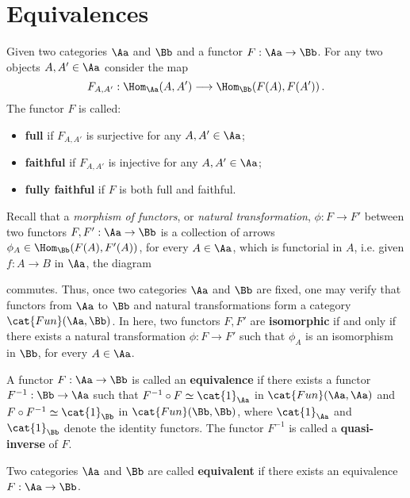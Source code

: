 
\section{Equivalences}

\begin{df}
    Given two categories $\Aa$ and $\Bb$ and
    a functor $F : \Aa \to \Bb$.
    For any two objects $A, A' \in \Aa$ 
    consider the map
    \begin{equation*}
        F_{A,A'} : \Hom_{\Aa}(A,A') \longrightarrow \Hom_{\Bb}(F(A),F(A'))\,.
    \end{equation*}
    The functor $F$ is called:
    \begin{itemize}
        \item \textbf{full} if $F_{A,A'}$ is surjective
        for any $A, A' \in \Aa$;

        \item \textbf{faithful} if $F_{A,A'}$ is injective
        for any $A, A' \in \Aa$;

        \item \textbf{fully faithful} if $F$ is both full and faithful.
    \end{itemize}
\end{df}

Recall that a \emph{morphism of functors},
or \emph{natural transformation},
$\phi : F \to F'$ between two functors
$F,F' : \Aa \to \Bb$ is a collection of arrows
$\phi_{A} \in \Hom_{\Bb}(F(A), F'(A))$, for every $A \in \Aa$,
which is functorial in $A$, i.e. given $f : A \to B$ in $\Aa$,
the diagram
\begin{center}
\end{center}
commutes. Thus, once two categories $\Aa$ and $\Bb$
are fixed, one may verify that functors from $\Aa$ to $\Bb$
and natural transformations form a category 
$\cat{Fun}(\Aa, \Bb)$. In here, two functors $F,F'$
are \textbf{isomorphic} if and only if
there exists a natural transformation $\phi:F \to F'$
such that $\phi_{A}$ is an isomorphism in $\Bb$, 
for every $A \in \Aa$.

\begin{df!}\label{cat-equivalence}
    A functor $F : \Aa \to \Bb$ is called 
    an \textbf{equivalence} if there exists a
    functor $F^{-1} : \Bb \to \Aa$ such that
    $F^{-1} \circ F \simeq \cat{1}_{\Aa}$ in $\cat{Fun}(\Aa, \Aa)$
    and
    $F \circ F^{-1} \simeq \cat{1}_{\Bb}$ in $\cat{Fun}(\Bb, \Bb)$,
    where $\cat{1}_{\Aa}$ and $\cat{1}_{\Bb}$
    denote the identity functors. The functor $F^{-1}$ is called a \textbf{quasi-inverse} of $F$.

    Two categories $\Aa$ and $\Bb$ are called \textbf{equivalent} if there exists an
    equivalence $F:\Aa \to \Bb$.
\end{df!}

